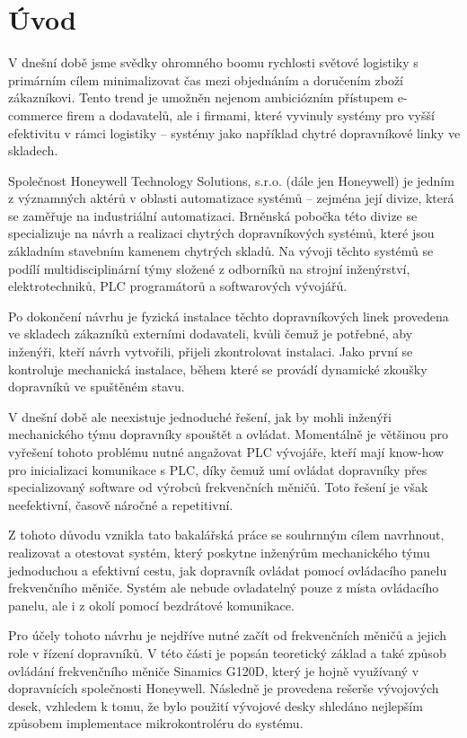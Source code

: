 \chapter*{Úvod}\label{chap:uvod}

V dnešní době jsme svědky ohromného boomu rychlosti světové logistiky s primárním cílem minimalizovat čas mezi objednáním a doručením zboží zákazníkovi. Tento trend je umožněn nejenom ambiciózním přístupem e-commerce firem a dodavatelů, ale i firmami, které vyvinuly systémy pro vyšší efektivitu v rámci logistiky – systémy jako například chytré dopravníkové linky ve skladech.

Společnost Honeywell Technology Solutions, s.r.o. (dále jen Honeywell) je jedním z významných aktérů v oblasti automatizace systémů – zejména její divize, která se zaměřuje na industriální automatizaci. Brněnská pobočka této divize se specializuje na návrh a realizaci chytrých dopravníkových systémů, které jsou základním stavebním kamenem chytrých skladů. Na vývoji těchto systémů se podílí multidisciplinární týmy složené z odborníků na strojní inženýrství, elektrotechniků, PLC programátorů a softwarových vývojářů.

Po dokončení návrhu je fyzická instalace těchto dopravníkových linek provedena ve skladech zákazníků externími dodavateli, kvůli čemuž je potřebné, aby inženýři, kteří návrh vytvořili, přijeli zkontrolovat instalaci. Jako první se kontroluje mechanická instalace, během které se provádí dynamické zkoušky dopravníků ve spuštěném stavu.

V dnešní době ale neexistuje jednoduché řešení, jak by mohli inženýři mechanického týmu dopravníky spouštět a ovládat. Momentálně je většinou pro vyřešení tohoto problému nutné angažovat PLC vývojáře, kteří mají know-how pro inicializaci komunikace s PLC, díky čemuž umí ovládat dopravníky přes specializovaný software od výrobců frekvenčních měničů. Toto řešení je však neefektivní, časově náročné a repetitivní.

Z tohoto důvodu vznikla tato bakalářská práce se souhrnným cílem navrhnout, realizovat a otestovat systém, který poskytne inženýrům mechanického týmu jednoduchou a efektivní cestu, jak dopravník ovládat pomocí ovládacího panelu frekvenčního měniče. Systém ale nebude ovladatelný pouze z místa ovládacího panelu, ale i z okolí pomocí bezdrátové komunikace.

Pro účely tohoto návrhu je nejdříve nutné začít od frekvenčních měničů a jejich role v řízení dopravníků. V této části je popsán teoretický základ a také způsob ovládání frekvenčního měniče Sinamics G120D, který je hojně využívaný v dopravnících společnosti Honeywell. Následně je provedena rešerše vývojových desek, vzhledem k tomu, že bylo použití vývojové desky shledáno nejlepším způsobem implementace mikrokontroléru do systému.

